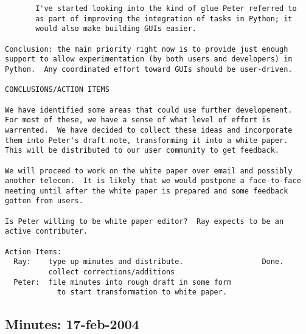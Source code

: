 \begin{verbatim}
       I've started looking into the kind of glue Peter referred to
       as part of improving the integration of tasks in Python; it
       would also make building GUIs easier.  

Conclusion: the main priority right now is to provide just enough
support to allow experimentation (by both users and developers) in
Python.  Any coordinated effort toward GUIs should be user-driven. 

CONCLUSIONS/ACTION ITEMS

We have identified some areas that could use further developement.
For most of these, we have a sense of what level of effort is
warrented.  We have decided to collect these ideas and incorporate
them into Peter's draft note, transforming it into a white paper.
This will be distributed to our user community to get feedback.  

We will proceed to work on the white paper over email and possibly
another telecon.  It is likely that we would postpone a face-to-face
meeting until after the white paper is prepared and some feedback
gotten from users.  

Is Peter willing to be white paper editor?  Ray expects to be an
active contributer.

Action Items:
  Ray:    type up minutes and distribute.                  Done.
          collect corrections/additions
  Peter:  file minutes into rough draft in some form
            to start transformation to white paper.

\end{verbatim}

\subsection{Minutes: 17-feb-2004}

